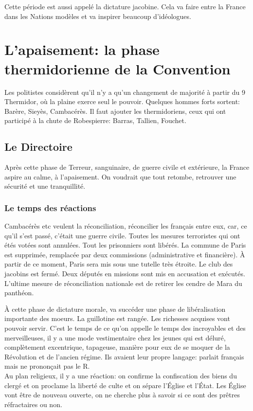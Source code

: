 \documentclass[10pt, a4paper, openany]{book}
\begin{document}
Cette période est aussi appelé la dictature jacobine. Cela va faire entre la France dans les Nations modèles et va inspirer beaucoup d'idéologues. 


\section{L'apaisement: la phase thermidorienne de la Convention}

Les politistes considèrent qu'il n'y a qu'un changement de majorité à partir du 9 Thermidor, où la plaine exerce seul le pouvoir. Quelques hommes forts sortent: Barère, Sieyès, Cambacérès. Il faut ajouter les thermidoriens, ceux qui ont participé à la chute de Robespierre: Barras, Tallien, Fouchet. 

\subsection{Le Directoire}

Après cette phase de Terreur, sanguinaire, de guerre civile et extérieure, la France aspire au calme, à l'apaisement. On voudrait que tout retombe, retrouver une sécurité et une tranquillité. 

\subsubsection{Le temps des réactions}

Cambacérès etc veulent la réconciliation, réconcilier les français entre eux, car, ce qu'il s'est passé, c'était une guerre civile. Toutes les mesures terroristes qui ont étés votées sont annulées. Tout les prisonniers sont libérés. La commune de Paris est supprimée, remplacée par deux commissions (administrative et financière). À partir de ce moment, Paris sera mis sous une tutelle très étroite. Le club des jacobins est fermé. Deux députés en missions sont mis en accusation et exécutés. \\
L'ultime mesure de réconciliation nationale est de retirer les cendre de Mara du panthéon. 


À cette phase de dictature morale, va succéder une phase de libéralisation importante des moeurs. La guillotine est rangée. Les richesses acquises vont pouvoir servir. C'est le temps de ce qu'on appelle le temps des incroyables et des merveilleuses, il y a une mode vestimentaire chez les jeunes qui est déluré, complètement excentrique, tapageuse, manière pour eux de se moquer de la Révolution et de l'ancien régime. Ils avaient leur propre langage: parlait français mais ne prononçait pas le R. \\
Au plan religieux, il y a une réaction: on confirme la confiscation des biens du clergé et on proclame la liberté de culte et on sépare l'Église et l'État. Les Église vont être de nouveau ouverte, on ne cherche plus à savoir si ce sont des prêtres réfractaires ou non. 
\end{document}
